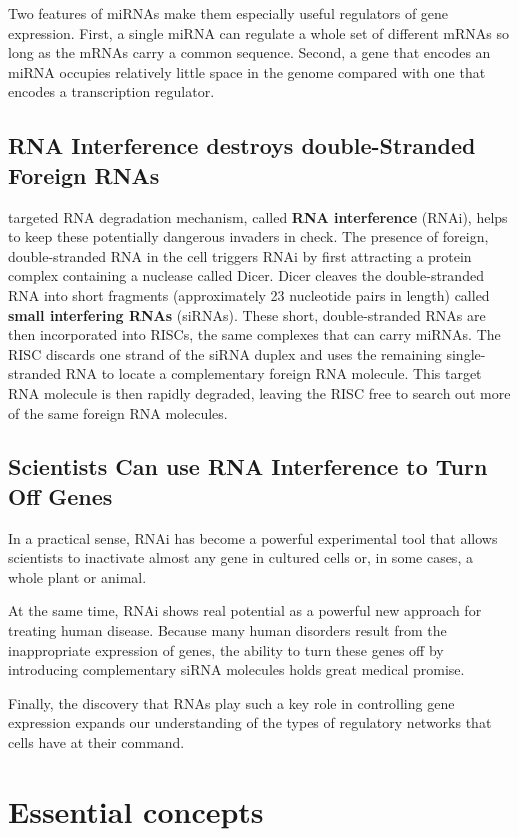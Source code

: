 Two features of miRNAs make them especially useful regulators of gene
expression. First, a single miRNA can regulate a whole set of different
mRNAs so long as the mRNAs carry a common sequence.
Second, a gene that encodes an miRNA occupies relatively little space in
the genome compared with one that encodes a transcription regulator.

\subsection{RNA Interference destroys double-Stranded Foreign RNAs}

targeted RNA degradation mechanism, called \textbf{RNA interference} (RNAi), helps to keep these
potentially dangerous invaders in check.
The presence of foreign, double-stranded RNA in the cell triggers RNAi by
first attracting a protein complex containing a nuclease called Dicer. Dicer
cleaves the double-stranded RNA into short fragments (approximately 23 nucleotide
pairs in length) called \textbf{small interfering RNAs} (siRNAs).
These short, double-stranded RNAs are then incorporated into RISCs, the
same complexes that can carry miRNAs. The RISC discards one strand of
the siRNA duplex and uses the remaining single-stranded RNA to locate
a complementary foreign RNA molecule. This target RNA
molecule is then rapidly degraded, leaving the RISC free to search out
more of the same foreign RNA molecules.

\subsection{Scientists Can use RNA Interference to Turn Off Genes}

In a practical sense, RNAi has become a powerful experimental tool that allows scientists to inactivate almost
any gene in cultured cells or, in some cases, a whole plant or animal.

At the same time, RNAi shows real potential as a powerful new approach
for treating human disease. Because many human disorders result from
the inappropriate expression of genes, the ability to turn these genes off
by introducing complementary siRNA molecules holds great medical
promise.

Finally, the discovery that RNAs play such a key role in controlling gene
expression expands our understanding of the types of regulatory networks
that cells have at their command.

\section{Essential concepts}

